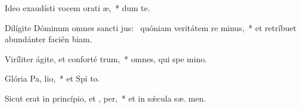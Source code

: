 \item Ideo exaudísti vocem orati æ,~* dum   te.
\item Dilígite Dóminum omnes sancti jus:~\pscross{} quóniam veritátem re minus,~* et retríbuet abundánter facién biam.
\item Viríliter ágite, et conforté  trum,~* omnes, qui spe  mino.
\item Glória Pa,  lio,~* et Spi to.
\item Sicut erat in princípio, et ,  per,~* et in sǽcula sæ. men.
